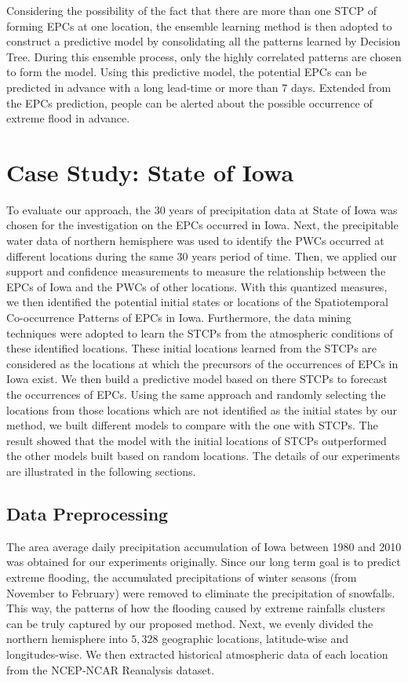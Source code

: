 \documentclass{acm_proc_article-sp}
\begin{document}
\newline 
Considering the possibility of the fact that there are more than one STCP of forming EPCs at one location, the ensemble learning method is then adopted to construct a predictive model by consolidating all the patterns learned by Decision Tree. During this ensemble process, only the highly correlated patterns are chosen to form the model. Using this predictive model, the potential EPCs can be predicted in advance with a long lead-time or more than 7 days. Extended from the EPCs prediction, people can be alerted about the possible occurrence of extreme flood in advance.   

\section{Case Study: State of Iowa}
\label{sec:CaseStudy}
To evaluate our approach, the 30 years of precipitation data at State of Iowa was chosen for the investigation on the EPCs occurred in Iowa. Next, the precipitable water data of northern hemisphere was used to identify the PWCs occurred at different locations during the same 30 years period of time. Then, we applied our support and confidence measurements to measure the relationship between the EPCs of Iowa and the PWCs of other locations. With this quantized measures, we then identified the potential initial states or locations of the Spatiotemporal Co-occurrence Patterns of EPCs in Iowa. Furthermore, the data mining techniques were adopted to learn the STCPs from the atmospheric conditions of these identified locations. 
\newline 
These initial locations learned from the STCPs are considered as the locations at which the precursors of the occurrences of EPCs in Iowa exist. We then build a predictive model based on there STCPs to forecast the occurrences of EPCs. Using the same approach and randomly selecting the locations from those locations which are not identified as the initial states by our method, we built different models to compare with the one with STCPs. The result showed that the model with the initial locations of STCPs outperformed the other models built based on random locations. The details of our experiments are illustrated in the following sections. 
\subsection{Data Preprocessing}   
The area average daily precipitation accumulation of Iowa between 1980 and 2010 was obtained for our experiments originally. Since our long term goal is to predict extreme flooding, the accumulated precipitations of winter seasons (from November to February) were removed to eliminate the precipitation of snowfalls. This way, the patterns of how the flooding caused by extreme rainfalls clusters can be truly captured by our proposed method.     
\newline
Next, we evenly divided the northern hemisphere into $5,328$ geographic locations, latitude-wise and longitudes-wise. We then extracted historical atmospheric data of each location from the NCEP-NCAR Reanalysis dataset\cite{kalnay1996ncep}.       
\end{document}
